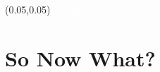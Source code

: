 \documentclass[aspectratio=169]{beamer} %
\begin{document}
\begin{frame}{}
    \setlength{\TPHorizModule}{\textwidth}
    \setlength{\TPVertModule}{\textwidth}
    \begin{textblock}{0.74}(0.05,0.05)
        \bfseries\large\textcolor{white}{Gephi}
    \end{textblock}

\end{frame}

\section{So Now What?}
\end{document}
